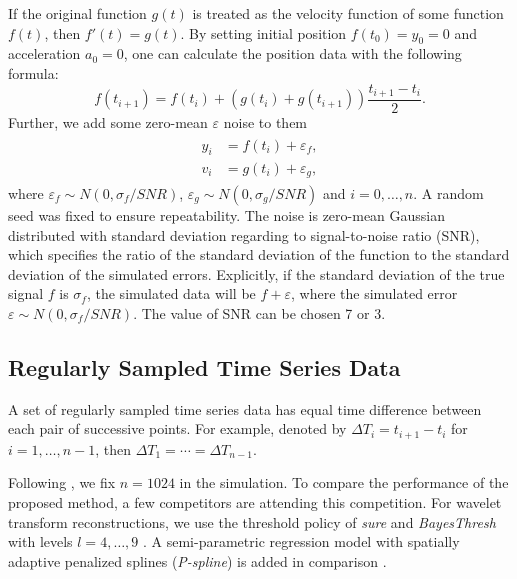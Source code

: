 If the original function $g(t)$ is treated as the velocity function of some function $f(t)$, then $f'(t)=g(t)$. By setting initial position $f(t_0)=y_0=0$ and acceleration $a_0=0$, one can calculate the position data with the following formula: 
\begin{equation}\label{generateVelocity}
f(t_{i+1})=f(t_i)+\left(g(t_i)+g(t_{i+1}) \right)\frac{t_{i+1}-t_i}{2}. 
\end{equation}
Further, we add some \iid  zero-mean $\varepsilon$ noise to them 
\begin{align}\label{tractorsplinegeneratefunctions}
\begin{split}
y_i &= f(t_i) + \varepsilon_f, \\
v_i &= g(t_i) + \varepsilon_g,
\end{split}
\end{align}
where $\varepsilon_f\sim N(0,\sigma_f/SNR)$, $\varepsilon_g\sim N(0,\sigma_g/SNR)$ and $i=0,\ldots,n$. A random seed was fixed to ensure repeatability. The noise is \iid zero-mean Gaussian distributed with standard deviation regarding to signal-to-noise ratio (SNR), which specifies the ratio of the standard deviation of the function to the standard deviation of the simulated errors. Explicitly, if the standard deviation of the true signal $f$ is $\sigma_f$, the simulated data will be $f+\varepsilon$, where the simulated error  $\varepsilon \sim N(0,\sigma_f/SNR)$. The value of SNR can be chosen 7 or 3. 



\subsection{Regularly Sampled Time Series Data}

A set of regularly sampled time series data has equal time difference between each pair of successive points. For example, denoted by $\Delta T_i = t_{i+1}-t_i$ for $i=1,\ldots,n-1$, then $\Delta T_1=\cdots = \Delta T_{n-1}$.

Following \cite{nason2010wavelet}, we fix $n=1024$ in the simulation. To compare the performance of the proposed method, a few competitors are attending this competition. For wavelet transform reconstructions, we use the threshold policy of \textit{sure} and \textit{BayesThresh} with levels $l=4, \ldots, 9$  \citep{donoho1995adapting, abramovich1998wavelet}. A semi-parametric regression model with spatially adaptive penalized splines (\textit{P-spline}) is added in comparison  \citep{krivobokova2008fast, ruppert2003semiparametric}.

